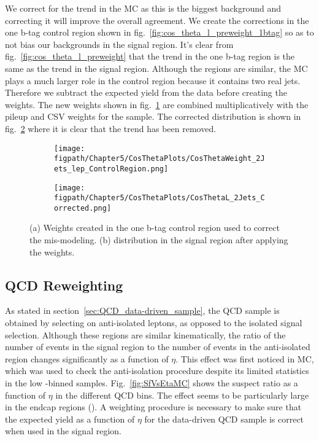 We correct for the trend in the \Wjets MC as this is the biggest background and correcting it will improve the overall agreement.
We create the corrections in the one b-tag control region shown in fig.~\ref{fig:cos_theta_l_preweight_1btag} so as to not bias our backgrounds in the signal region.
It's clear from fig.~\ref{fig:cos_theta_l_preweight} that the trend in the one b-tag region is the same as the trend in the signal region.
Although the regions are similar, the \ttbar MC plays a much larger role in the control region because it contains two real \cPqb jets.
Therefore we subtract the expected \ttbar yield from the data before creating the weights.
The new weights shown in fig.~\ref{fig:cos_theta_l_weight} are combined multiplicatively with the pileup and CSV weights for the \Wjets sample.
The corrected distribution is shown in fig.~\ref{fig:cos_theta_l_corrected} where it is clear that the trend has been removed.

\begin{figure}[!hbt]
    \centering
    \begin{subfigure}[t]{0.48\textwidth}
      \texttt{[image: \\figpath/Chapter5/CosThetaPlots/CosThetaWeight\_2Jets\_lep\_ControlRegion.png]}
      \caption{}
      \label{fig:cos_theta_l_weight}
    \end{subfigure}
    \begin{subfigure}[t]{0.48\textwidth}
      \texttt{[image: \\figpath/Chapter5/CosThetaPlots/CosThetaL\_2Jets\_Corrected.png]}
      \caption{}
      \label{fig:cos_theta_l_corrected}
    \end{subfigure}
    \caption{(a) Weights created in the one b-tag control region used to correct the \costhetal mis-modeling. (b) \costhetal distribution in the signal region after applying the weights.}
    \label{fig:cos_theta_l_postweight}
\end{figure}

\subsection{QCD Reweighting}
\label{sec:QCD_reweighting}

As stated in section~\ref{sec:QCD_data-driven_sample}, the QCD sample is obtained by selecting on anti-isolated leptons, as opposed to the isolated signal selection.
Although these regions are similar kinematically, the ratio of the number of events in the signal region to the number of events in the anti-isolated region changes significantly as a function of $\eta$.
This effect was first noticed in MC, which was used to check the anti-isolation procedure despite its limited statistics in the low \pthat-binned samples.
Fig.~\ref{fig:SfVsEtaMC} shows the suspect ratio as a function of $\eta$ in the different QCD \pthat bins.
The effect seems to be particularly large in the endcap regions ().
A weighting procedure is necessary to make sure that the expected yield as a function of $\eta$ for the data-driven QCD sample is correct when used in the signal region.

